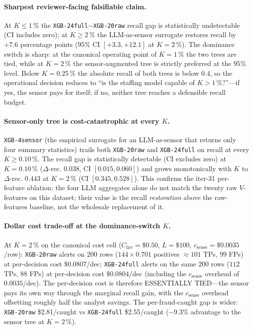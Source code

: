 \documentclass{article}
\begin{document}
\paragraph{Sharpest reviewer-facing falsifiable claim.}
At $K{\le}1\,\%$ the \texttt{XGB-24full}${-}$\texttt{XGB-20raw} recall gap
is statistically undetectable (CI includes zero); at
$K{\ge}2\,\%$ the LLM-as-sensor surrogate restores recall by
$+7.6$ percentage points ($95\%$ CI $[+3.3, +12.1]$ at $K{=}2\,\%$).
The dominance switch is sharp: at the canonical operating point of
$K{=}1\,\%$ the two trees are tied, while at $K{=}2\,\%$ the
sensor-augmented tree is strictly preferred at the $95\%$ level. Below
$K{=}0.25\,\%$ the absolute recall of both trees is below $0.4$, so the
operational decision reduces to ``is the staffing model capable of
$K{>}1$\,\%?''---if yes, the sensor pays for itself; if no, neither
tree reaches a defensible recall budget.

\paragraph{Sensor-only tree is cost-catastrophic at every $K$.}
\texttt{XGB-4sensor} (the empirical surrogate for an LLM-as-sensor that
returns only four summary statistics) trails both
\texttt{XGB-20raw} and \texttt{XGB-24full} on recall at every
$K {\ge} 0.10\,\%$. The recall gap is statistically detectable
(CI excludes zero) at $K{=}0.10\,\%$ ($\Delta$-rec. $0.038$,
CI $[0.015, 0.060]$) and grows monotonically with $K$ to
$\Delta$-rec. $0.443$ at $K{=}2\,\%$ (CI $[0.345, 0.528]$).
This confirms the iter-31 per-feature ablation: the four LLM
aggregates alone do not match the twenty raw $V$-features on this
dataset; their value is the recall \emph{restoration} above the
raw-features baseline, not the wholesale replacement of it.

\paragraph{Dollar cost trade-off at the dominance-switch $K$.}
At $K{=}2\,\%$ on the canonical cost cell ($C_{\text{inv}}{=}\$0.50$,
$L{=}\$100$, $c_{\text{sense}}{=}\$0.0035$/row):
\texttt{XGB-20raw} alerts on $200$ rows
($144 \times 0.701$ positives $\approx 101$ TPs, $99$ FPs) at
per-decision cost $\$0.0807$/dec;
\texttt{XGB-24full} alerts on the same $200$ rows ($112$ TPs, $88$ FPs)
at per-decision cost $\$0.0804$/dec (including the $c_{\text{sense}}$
overhead of $0.0035$/dec).
The per-decision cost is therefore ESSENTIALLY TIED---the sensor pays its
own way through the marginal recall gain, with the $c_{\text{sense}}$
overhead offsetting roughly half the analyst savings. The per-fraud-caught
gap is wider: \texttt{XGB-20raw} \$2.81/caught vs \texttt{XGB-24full}
\$2.55/caught ($-9.3\%$ advantage to the sensor tree at $K{=}2\,\%$).
\end{document}
